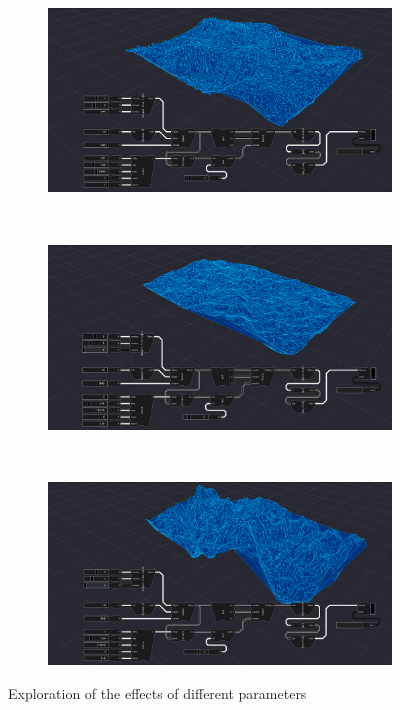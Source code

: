 \begin{figure}
  \centering
  \begin{subfigure}[b]{0.90\linewidth}
    \centering
    \includegraphics[width=\linewidth]{explore-1.PNG}
  \end{subfigure}%
  \\ 
  \begin{subfigure}[b]{0.90\linewidth}
    \centering
    \includegraphics[width=\linewidth]{explore-2.PNG}
  \end{subfigure}%
  \\
  \begin{subfigure}[b]{0.90\linewidth}
    \centering
    \includegraphics[width=\linewidth]{explore-3.PNG}
  \end{subfigure}%
  \caption[Types of \ac{vpl}s]{Exploration of the effects of different parameters}%
  \label{fig:parametrization}
\end{figure}


